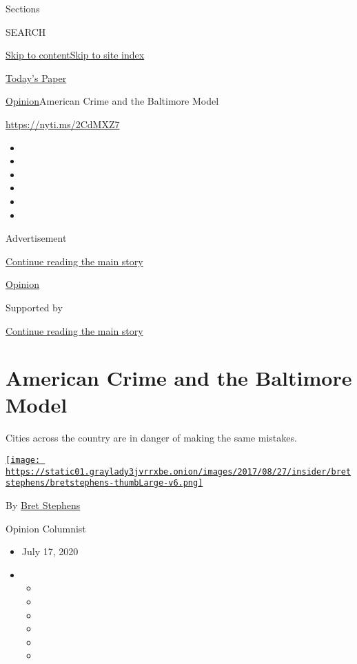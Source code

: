 Sections

SEARCH

\protect\hyperlink{site-content}{Skip to
content}\protect\hyperlink{site-index}{Skip to site index}

\href{https://myaccount.nytimes3xbfgragh.onion/auth/login?response_type=cookie\&client_id=vi}{}

\href{https://www.nytimes3xbfgragh.onion/section/todayspaper}{Today's
Paper}

\href{/section/opinion}{Opinion}\textbar{}American Crime and the
Baltimore Model

\url{https://nyti.ms/2CdMXZ7}

\begin{itemize}
\item
\item
\item
\item
\item
\item
\end{itemize}

Advertisement

\protect\hyperlink{after-top}{Continue reading the main story}

\href{/section/opinion}{Opinion}

Supported by

\protect\hyperlink{after-sponsor}{Continue reading the main story}

\hypertarget{american-crime-and-the-baltimore-model}{%
\section{American Crime and the Baltimore
Model}\label{american-crime-and-the-baltimore-model}}

Cities across the country are in danger of making the same mistakes.

\href{https://www.nytimes3xbfgragh.onion/by/bret-stephens}{\texttt{[image: https://static01.graylady3jvrrxbe.onion/images/2017/08/27/insider/bretstephens/bretstephens-thumbLarge-v6.png]}}

By \href{https://www.nytimes3xbfgragh.onion/by/bret-stephens}{Bret
Stephens}

Opinion Columnist

\begin{itemize}
\item
  July 17, 2020
\item
  \begin{itemize}
  \item
  \item
  \item
  \item
  \item
  \item
  \end{itemize}
\end{itemize}

